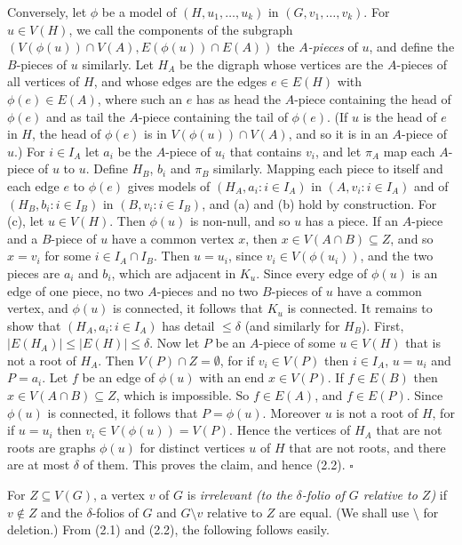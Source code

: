 {Conversely, let $\phi$ be a model of $(H, u_1, \dots, u_k)$ in $(G, v_1, \dots, v_k)$. For $u \in V(H)$, we call the components of the subgraph $(V(\phi(u)) \cap V(A), E(\phi(u)) \cap E(A))$ the \textit{$A$-pieces} of $u$, and define the $B$-pieces of $u$ similarly. Let $H_A$ be the digraph whose vertices are the $A$-pieces of all vertices of $H$, and whose edges are the edges $e \in E(H)$ with $\phi(e) \in E(A)$, where such an $e$ has as head the $A$-piece containing the head of $\phi(e)$ and as tail the $A$-piece containing the tail of $\phi(e)$. (If $u$ is the head of $e$ in $H$, the head of $\phi(e)$ is in $V(\phi(u)) \cap V(A)$, and so it is in an $A$-piece of $u$.) For $i \in I_A$ let $a_i$ be the $A$-piece of $u_i$ that contains $v_i$, and let $\pi_A$ map each $A$-piece of $u$ to $u$. Define $H_B$, $b_i$ and $\pi_B$ similarly. Mapping each piece to itself and each edge $e$ to $\phi(e)$ gives models of $(H_A, a_i : i \in I_A)$ in $(A, v_i : i \in I_A)$ and of $(H_B, b_i : i \in I_B)$ in $(B, v_i : i \in I_B)$, and (a) and (b) hold by construction. For (c), let $u \in V(H)$. Then $\phi(u)$ is non-null, and so $u$ has a piece. If an $A$-piece and a $B$-piece of $u$ have a common vertex $x$, then $x \in V(A \cap B) \subseteq Z$, and so $x = v_i$ for some $i \in I_A \cap I_B$. Then $u = u_i$, since $v_i \in V(\phi(u_i))$, and the two pieces are $a_i$ and $b_i$, which are adjacent in $K_u$. Since every edge of $\phi(u)$ is an edge of one piece, no two $A$-pieces and no two $B$-pieces of $u$ have a common vertex, and $\phi(u)$ is connected, it follows that $K_u$ is connected. It remains to show that $(H_A, a_i : i \in I_A)$ has detail $\le \delta$ (and similarly for $H_B$). First, $|E(H_A)| \le |E(H)| \le \delta$. Now let $P$ be an $A$-piece of some $u \in V(H)$ that is not a root of $H_A$. Then $V(P) \cap Z = \emptyset$, for if $v_i \in V(P)$ then $i \in I_A$, $u = u_i$ and $P = a_i$. Let $f$ be an edge of $\phi(u)$ with an end $x \in V(P)$. If $f \in E(B)$ then $x \in V(A \cap B) \subseteq Z$, which is impossible. So $f \in E(A)$, and $f \in E(P)$. Since $\phi(u)$ is connected, it follows that $P = \phi(u)$. Moreover $u$ is not a root of $H$, for if $u = u_i$ then $v_i \in V(\phi(u)) = V(P)$. Hence the vertices of $H_A$ that are not roots are graphs $\phi(u)$ for distinct vertices $u$ of $H$ that are not roots, and there are at most $\delta$ of them. This proves the claim, and hence (2.2). $\square$}

For $Z \subseteq V(G)$, a vertex $v$ of $G$ is \textit{irrelevant (to the $\delta$-folio of $G$ relative to $Z$)} if $v \notin Z$ and the $\delta$-folios of $G$ and $G \setminus v$ relative to $Z$ are equal. (We shall use $\setminus$ for deletion.) From (2.1) and (2.2), the following follows easily.
